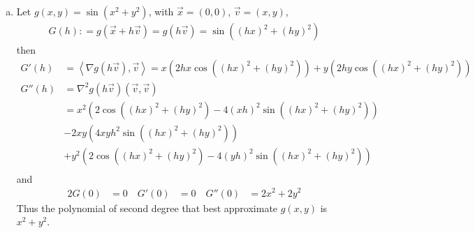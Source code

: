\documentclass[a4paper,12pt]{article}
\theoremstyle{definition}
\begin{document}
\begin{enumerate}
\begin{enumerate}[(a)]


\item Let $g(x,y) = \sin (x^2+y^2)$, with $\vec{x} = (0,0)$, $\vec{v}=(x,y)$,
\begin{align*}
G(h): = g(\vec{x}+h\vec{v}) = g(h\vec{v}) = \sin ((hx)^2+(hy)^2)
\end{align*}
then
\begin{align*}
G'(h)&=\left\langle\nabla g(h\vec{v}),\vec{v}\right\rangle  = x (2hx\cos((hx)^2+(hy)^2)) + y (2hy\cos((hx)^2+(hy)^2))\\
G''(h)&=\nabla^2 g(h\vec{v})(\vec{v},\vec{v})\\
&=x^2(2\cos((hx)^2+(hy)^2)-4(xh)^2\sin((hx)^2+(hy)^2))\\
&-2xy(4xyh^2\sin((hx)^2+(hy)^2))\\
&+y^2(2\cos((hx)^2+(hy)^2)-4(yh)^2\sin((hx)^2+(hy)^2))\\
\end{align*}
and 
\begin{alignat*}{2}
G(0) &= 0 \quad G'(0) &= 0 \quad  G''(0) &= 2x^2 + 2y^2 %
\end{alignat*}
Thus the polynomial of second degree that best approximate $g(x,y)$ is $x^2+y^2$.	
\end{enumerate}




\end{enumerate}
\end{document}
